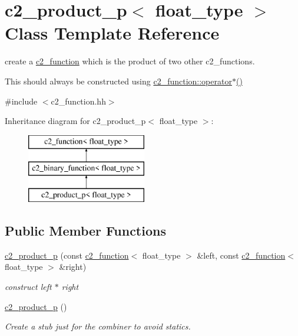 \hypertarget{classc2__product__p}{\section{c2\-\_\-product\-\_\-p$<$ float\-\_\-type $>$ Class Template Reference}
\label{classc2__product__p}
}


create a \hyperlink{classc2__function}{c2\-\_\-function} which is the product of two other c2\-\_\-functions.

This should always be constructed using \hyperlink{classc2__function_a7744675c98a8ec63320ac1c0b61bec9c}{c2\-\_\-function\-::operator$\ast$()}  




{\ttfamily \#include $<$c2\-\_\-function.\-hh$>$}

Inheritance diagram for c2\-\_\-product\-\_\-p$<$ float\-\_\-type $>$\-:\begin{figure}[H]
\begin{center}
\leavevmode
\includegraphics[height=3.000000cm]{classc2__product__p}
\end{center}
\end{figure}
\subsection*{Public Member Functions}
\begin{DoxyCompactItemize}
\item 
\hyperlink{classc2__product__p_af39b700c5114f8e7fc46f12d23125fd8}{c2\-\_\-product\-\_\-p} (const \hyperlink{classc2__function}{c2\-\_\-function}$<$ float\-\_\-type $>$ \&left, const \hyperlink{classc2__function}{c2\-\_\-function}$<$ float\-\_\-type $>$ \&right)
\begin{DoxyCompactList}\small\item\em construct {\itshape left} $\ast$ {\itshape right} \end{DoxyCompactList}\item 
\hypertarget{classc2__product__p_a82b8eb1b1621b07a6a02ce38f3c2f40e}{\hyperlink{classc2__product__p_a82b8eb1b1621b07a6a02ce38f3c2f40e}{c2\-\_\-product\-\_\-p} ()}\label{classc2__product__p_a82b8eb1b1621b07a6a02ce38f3c2f40e}

\begin{DoxyCompactList}\small\item\em Create a stub just for the combiner to avoid statics. \end{DoxyCompactList}\end{DoxyCompactItemize}
